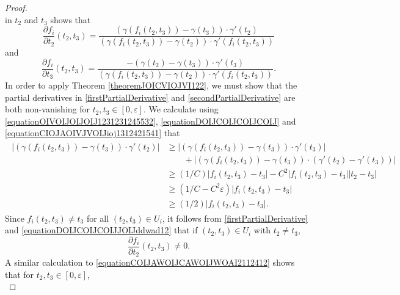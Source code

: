 \documentclass[dvipsnames,letterpaper,12pt]{article}
\numberwithin{equation}{section}
\numberwithin{theorem}{section}
\begin{document}
\begin{proof}
\begin{equation}
    \end{equation}
    in $t_2$ and $t_3$ shows that
    \begin{equation} \label{firstPartialDerivative}
        \frac{\partial f_i}{\partial t_2}(t_2,t_3) = \frac{(\gamma(f_i(t_2,t_3)) - \gamma(t_3)) \cdot \gamma'(t_2)}{(\gamma(f_i(t_2,t_3)) - \gamma(t_2)) \cdot \gamma'(f_i(t_2,t_3))}
    \end{equation}
    and
    \begin{equation} \label{secondPartialDerivative}
        \frac{\partial f_i}{\partial t_3}(t_2,t_3) = \frac{- (\gamma(t_2) - \gamma(t_3)) \cdot \gamma'(t_3)}{(\gamma(f_i(t_2,t_3)) - \gamma(t_2)) \cdot \gamma'(f_i(t_2,t_3))}.
    \end{equation}
    In order to apply Theorem \ref{theoremJOICVIOJVI122}, we must show that the partial derivatives in \ref{firstPartialDerivative} and \ref{secondPartialDerivative} are both non-vanishing for $t_2,t_3 \in [0,\varepsilon]$. We calculate using \eqref{equationOIVOIJOIJOIJ1231231245532}, \eqref{equationDOIJCOIJCOIJCOIJ} and \eqref{equationCIOJAOIVJVOIJioj1312421541} that
    \begin{align} \label{equationDOIJCOIJCOIJJOIJddwad12}
    \begin{split}
        |(\gamma(f_i(t_2,t_3)) - \gamma(t_3)) \cdot \gamma'(t_2)| &\geq |(\gamma(f_i(t_2,t_3)) - \gamma(t_3)) \cdot \gamma'(t_3)|\\
        &\quad\quad + |(\gamma(f_i(t_2,t_3)) - \gamma(t_3)) \cdot (\gamma'(t_2) - \gamma'(t_3))|\\
        &\geq (1/C) |f_i(t_2,t_3) - t_3| - C^2 |f_i(t_2,t_3) - t_3||t_2 - t_3|\\
        &\geq (1/C - C^2 \varepsilon) |f_i(t_2,t_3) - t_3|\\
        &\geq (1/2) |f_i(t_2,t_3) - t_3|.
    \end{split}
    \end{align}
    Since $f_i(t_2,t_3) \neq t_3$ for all $(t_2,t_3) \in U_i$, it follows from \eqref{firstPartialDerivative} and \eqref{equationDOIJCOIJCOIJJOIJddwad12} that if $(t_2,t_3) \in U_i$ with $t_2 \neq t_3$,
    \begin{equation} \label{nonvanishingt2derivative}
        \frac{\partial f_i}{\partial t_2}(t_2,t_3) \neq 0.
    \end{equation}
    A similar calculation to \eqref{equationCOIJAWOIJCAWOIJWOAI2112412} shows that for $t_2,t_3 \in [0,\varepsilon]$,
    \begin{equation} \label{thirdPartialDerivativeIsNonvanishing}

\end{equation}
\end{proof}
\end{document}
